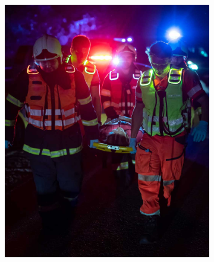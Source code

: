     \begin{figure} [!ht]
        \centering
        \caption{SunFibre Wearable active lighting system}

        \begin{subfigure}[b]{0.495\textwidth}
            \includegraphics[width=\textwidth]{01.INTRO/Figs/active_lighting_system01.jpg}
        \end{subfigure}
         \hfill
        \begin{subfigure}[b]{0.496\textwidth}
             \centering

\end{subfigure}
\end{figure}
